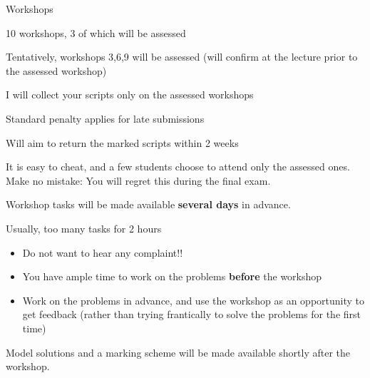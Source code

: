 \begin{frame}{Workshops}

\begin{itemize}
{\small
\item 10 workshops, 3 of which will be assessed
\item Tentatively, workshops 3,6,9 will be assessed (will confirm at the lecture prior to the assessed workshop)
\item I will collect your scripts only on the assessed workshops
\item Standard penalty applies for late submissions
\item Will aim to return the marked scripts within 2 weeks
\item It is easy to cheat, and a few students choose to attend
      only the assessed ones. Make no mistake: You will regret this during the final exam.
\vspace{0.2cm}
\item Workshop tasks will be made available {\bf several days} in advance.
\item Usually, too many tasks for 2 hours
\begin{itemize}
  \item Do not want to hear any complaint!!
  \item You have ample time to work on the problems {\bf before} the workshop
  \item Work on the problems in advance, and use the workshop as an opportunity to get feedback
        (rather than trying frantically to solve the problems for the first time)
\end{itemize}
\item Model solutions and a marking scheme will be made available shortly after the workshop.
}
\end{itemize}

\end{frame}

%
%
%

